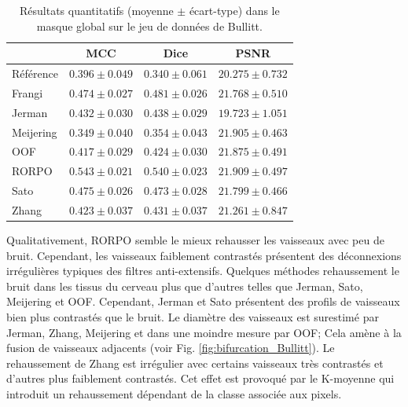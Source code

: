 \begin{table}[H]
  \begin{center}
      \caption{Résultats quantitatifs (moyenne $\pm$ écart-type) dans le masque global \maskglobal sur le jeu de données de Bullitt.}
      \label{Table:quantitative results Bullit}
  \begin{tabular}{lccc}
      \hline
          & MCC & Dice & PSNR \\ 
      \hline
      Référence	& $ 0.396 \pm 0.049 $ & $ 0.340 \pm 0.061 $ & $ 20.275 \pm	0.732 $ \\ 
      Frangi	    & $ 0.474 \pm 0.027 $ & $ 0.481 \pm 0.026 $ & $ 21.768 \pm	0.510 $ \\ 
      Jerman	    & $ 0.432 \pm 0.030 $ & $ 0.438 \pm 0.029 $ & $ 19.723 \pm	1.051 $ \\ 
      Meijering	& $ 0.349 \pm 0.040 $ & $ 0.354 \pm 0.043 $ & $ 21.905 \pm	0.463 $ \\ 
      OOF	        & $ 0.417 \pm 0.029 $ & $ 0.424 \pm 0.030 $ & $ 21.875 \pm	0.491 $ \\ 
      RORPO	    & $ 0.543 \pm 0.021 $ & $ 0.540 \pm 0.023 $ & $ 21.909 \pm	0.497 $ \\ 
      Sato	    & $ 0.475 \pm 0.026 $ & $ 0.473 \pm 0.028 $ & $ 21.799 \pm	0.466 $ \\ 
      Zhang	    & $ 0.423 \pm 0.037 $ & $ 0.431 \pm 0.037 $ & $ 21.261 \pm	0.847 $ \\ 

      \hline
  \end{tabular} 
\end{center}
\end{table}

Qualitativement, RORPO semble le mieux rehausser les vaisseaux avec peu de bruit. Cependant, les vaisseaux faiblement contrastés présentent des déconnexions irrégulières typiques des filtres anti-extensifs. Quelques méthodes rehaussement le bruit dans les tissus du cerveau plus que d'autres telles que Jerman, Sato, Meijering et OOF. Cependant, Jerman et Sato présentent des profils de vaisseaux bien plus contrastés que le bruit. Le diamètre des vaisseaux est surestimé par Jerman, Zhang, Meijering et dans une moindre mesure par OOF; Cela amène à la fusion de vaisseaux adjacents (voir Fig. \ref{fig:bifurcation_Bullitt}). Le rehaussement de Zhang est irrégulier avec certains vaisseaux très contrastés et d'autres plus faiblement contrastés. Cet effet est provoqué par le K-moyenne qui introduit un rehaussement dépendant de la classe associée aux pixels.

